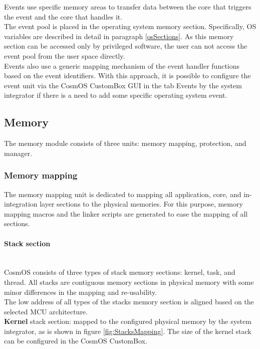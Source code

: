 Events use specific memory areas to transfer data between the core that triggers the event and the core that handles it. \\
\indent The event pool is placed in the operating system memory section. Specifically, \ac{OS} variables are described in detail in paragraph \ref{osSections}. As this memory section can be accessed only by privileged software, the user can not access the event pool from the user space directly.\\
\indent Events also use a generic mapping mechanism of the event handler functions based on the event identifiers. With this approach, it is possible to configure the event unit via the CosmOS CustomBox \ac{GUI} in the tab Events by the system integrator if there is a need to add some specific operating system event.

\subsection{Memory}
The memory module consists of three units: memory mapping, protection, and manager.
\subsubsection{Memory mapping}\label{memoryMapping}
The memory mapping unit is dedicated to mapping all application, core, and in- integration layer sections to the physical memories. For this purpose, memory mapping macros and the linker scripts are generated to ease the mapping of all sections.

\paragraph{Stack section}\mbox{}\\
\indent CosmOS consists of three types of stack memory sections: kernel, task, and thread. All stacks are contiguous memory sections in physical memory with some minor differences in the mapping and re-usability.\\
\indent The low address of all types of the stacks memory section is aligned based on the selected \ac{MCU} architecture. \\

\textbf{Kernel} stack section: mapped to the configured physical memory by the system integrator, as is shown in figure \ref{fig:StacksMapping}. The size of the kernel stack can be configured in the CosmOS CustomBox.\\

